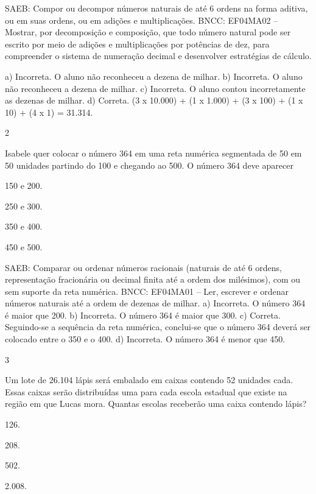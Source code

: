 \begin{mdframed}[linewidth=2pt,linecolor=salmao,roundcorner=2pt]
\begin{escolha}
{\begin{escolha}
SAEB: Compor ou decompor números naturais de até 6 ordens na
forma aditiva, ou em suas ordens, ou em adições e multiplicações.
BNCC: EF04MA02 -- Mostrar, por decomposição e composição, que todo número natural pode ser escrito
por meio de adições e multiplicações por potências de dez, para compreender o sistema de
numeração decimal e desenvolver estratégias de cálculo.

a) Incorreta. O aluno não reconheceu a dezena de milhar.
b) Incorreta. O aluno não reconheceu a dezena de milhar.
c) Incorreta. O aluno contou incorretamente as dezenas de milhar.
d) Correta. (3 x 10.000) + (1 x 1.000) + (3 x 100) + (1 x 10) + (4 x 1) = 31.314.

\num{2}

Isabele quer colocar o número 364 em uma reta numérica segmentada de 50 em 50 unidades partindo do 100 e chegando ao 500. O número 364 deve aparecer

\begin{escolha}
\item
  150 e 200.
\item
  250 e 300.
\item
  350 e 400.
\item
  450 e 500.
\end{escolha}

SAEB: Comparar ou ordenar números
racionais (naturais de até 6 ordens, representação fracionária ou
decimal finita até a ordem dos milésimos), com ou sem suporte da reta
numérica.
BNCC: EF04MA01 -- Ler, escrever e ordenar números naturais até a ordem de dezenas de milhar.
a) Incorreta. O número 364 é maior que 200.
b) Incorreta. O número 364 é maior que 300.
c) Correta. Seguindo-se a sequência da reta numérica, conclui-se que o número 364 deverá
ser colocado entre o 350 e o 400.
d) Incorreta. O número 364 é menor que 450.

\num{3}

Um lote de 26.104 lápis será embalado em caixas contendo 52 unidades cada. Essas caixas serão distribuídas uma para cada escola
estadual que existe na região em que Lucas mora. Quantas escolas
receberão uma caixa contendo lápis?

\begin{escolha}
\item
  126.
\item
  208.
\item
  502.
\item
  2.008.
\end{escolha}


\end{escolha}}
\end{escolha}
\end{mdframed}
